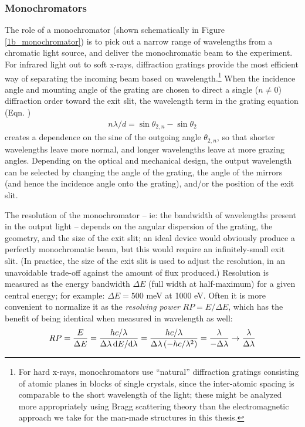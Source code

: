 \subsubsection{Monochromators}
The role of a monochromator (shown schematically in Figure \ref{1b_monochromator}) is to pick out a narrow range of wavelengths from a chromatic light source, and deliver the monochromatic beam to the experiment.  For infrared light out to soft x-rays, diffraction gratings provide the most efficient way of separating the incoming beam based on wavelength.\footnote{For hard x-rays, monochromators use ``natural'' diffraction gratings consisting of atomic planes in blocks of single crystals, since the inter-atomic spacing is comparable to the short wavelength of the light; these might be analyzed more appropriately using Bragg scattering theory than the electromagnetic approach we take for the man-made structures in this thesis.}  When the incidence angle and mounting angle of the grating are chosen to direct a single ($n\neq0$) diffraction order toward the exit slit, the wavelength term in the grating equation (Eqn. )
\begin{eqnarray*}
n\lambda / d = \sin\theta_{2,n} - \sin\theta_{2}
\end{eqnarray*}
creates a dependence on the sine of the outgoing angle $\theta_{2,n}$, so that shorter wavelengths leave more normal, and longer wavelengths leave at more grazing angles.  Depending on the optical and mechanical design, the output wavelength can be selected by changing the angle of the grating, the angle of the mirrors (and hence the incidence angle onto the grating), and/or the position of the exit slit.

The resolution of the monochromator  -- ie: the bandwidth of wavelengths present in the output light -- depends on the angular dispersion of the grating, the geometry, and the size of the exit slit; an ideal device would obviously produce a perfectly monochromatic beam, but this would require an infinitely-small exit slit.  (In practice, the size of the exit slit is used to adjust the resolution, in an unavoidable trade-off against the amount of flux produced.)  Resolution is measured as the energy bandwidth $\Delta E$ (full width at half-maximum) for a given central energy; for example: $\Delta E = 500$ meV at 1000 eV.   Often it is more convenient to normalize it as the \emph{resolving power} $RP = E/\Delta E$, which has the benefit of being identical when measured in wavelength as well:
\begin{align}
RP = \frac{E}{\Delta E} = \frac{hc/\lambda}{\Delta \lambda \, \mathrm{d} E/\mathrm{d} \lambda} = \frac{hc/\lambda}{\Delta \lambda\, (-hc / \lambda^2)} =  \frac{\lambda}{-\Delta \lambda} \rightarrow \frac{\lambda}{\Delta \lambda}
\end{align}


